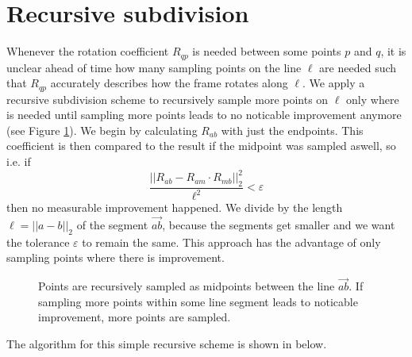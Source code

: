 \documentclass[../thesis.tex]{subfiles}
\begin{document}
\section{Recursive subdivision}
Whenever the rotation coefficient $R_{qp}$ is needed between some points $p$ and $q$,
it is unclear ahead of time how many sampling points on the line $\ell$
are needed such that $R_{qp}$ accurately describes how the frame rotates along $\ell$.
We apply a recursive subdivision scheme to recursively sample more points on $\ell$ only where is needed
until sampling more points leads to no noticable improvement anymore (see Figure \ref{fig:recursiveSubdivision}).
We begin by calculating $R_{ab}$ with just the endpoints. This coefficient is then compared to the result if the midpoint was sampled aswell,
so i.e. if
$$\frac{||R_{ab} - R_{am}\cdot R_{mb}||^2_2}{\ell^2}< \varepsilon$$
then no measurable improvement happened. We divide by the length $\ell = ||a-b||_2$ of the segment $\vec{ab}$, because the segments get smaller
and we want the tolerance $\varepsilon$ to remain the same.
This approach has the advantage of only sampling points where there is improvement.
\begin{figure}[htb]
  \centering
  \def\svgwidth{20em}
  
  \caption{Points are recursively sampled as midpoints between the line $\vec{ab}$.
  If sampling more points within some line segment leads to noticable improvement, more points are sampled.}
  \label{fig:recursiveSubdivision}
\end{figure}
The algorithm for this simple recursive scheme is shown in below.
\end{document}
